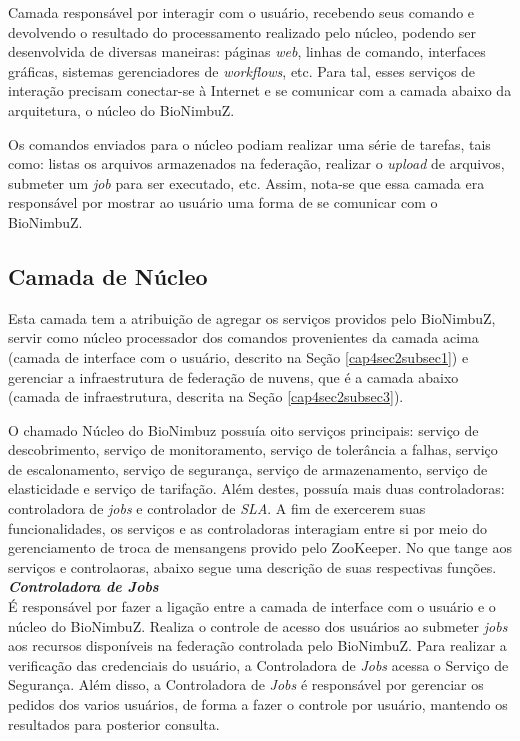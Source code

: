 Camada responsável por interagir com o usuário, recebendo seus comando e devolvendo o resultado do processamento realizado pelo núcleo, podendo ser desenvolvida de diversas maneiras: páginas \textit{web}, linhas de comando, interfaces gráficas, sistemas gerenciadores de \textit{workflows}, etc. Para tal, esses serviços de interação precisam conectar-se à Internet e se comunicar com a camada abaixo da arquitetura, o núcleo do BioNimbuZ. 

Os comandos enviados para o núcleo podiam realizar uma série de tarefas, tais como: listas os arquivos armazenados na federação, realizar o \textit{upload} de arquivos, submeter um \textit{job} para ser executado, etc. Assim, nota-se que essa camada era responsável por mostrar ao usuário uma forma de se comunicar com o BioNimbuZ.

\subsection{Camada de Núcleo} \label{cap4sec2subsec2}

Esta camada tem a atribuição de agregar os serviços providos pelo BioNimbuZ, servir como núcleo processador dos comandos provenientes da camada acima (camada de interface com o usuário, descrito na Seção \ref{cap4sec2subsec1}) e gerenciar a infraestrutura de federação de nuvens, que é a camada abaixo (camada de infraestrutura, descrita na Seção \ref{cap4sec2subsec3}).

O chamado Núcleo do BioNimbuz possuía oito serviços principais: serviço de descobrimento, serviço de monitoramento, serviço de tolerância a falhas, serviço de escalonamento, serviço de segurança, serviço de armazenamento, serviço de elasticidade e serviço de tarifação. Além destes, possuía mais duas controladoras: controladora de \textit{jobs} e controlador de \textit{SLA}. A fim de exercerem suas funcionalidades, os serviços e as controladoras interagiam entre si por meio do gerenciamento de troca de mensangens provido pelo ZooKeeper. No que tange aos serviços e controlaoras, abaixo segue uma descrição de suas respectivas funções. \\

\noindent
\textbf{\textit{Controladora de \textit{Jobs}}} \\

\noindent
É responsável por fazer a ligação entre a camada de interface com o usuário e o núcleo do BioNimbuZ. Realiza o controle de acesso dos usuários ao submeter \textit{jobs} aos recursos disponíveis na federação controlada pelo BioNimbuZ. Para realizar a verificação das credenciais do usuário, a Controladora de \textit{Jobs} acessa o Serviço de Segurança. Além disso, a Controladora de \textit{Jobs} é responsável por gerenciar os pedidos dos varios usuários, de forma a fazer o controle por usuário, mantendo os resultados para posterior consulta. \\

